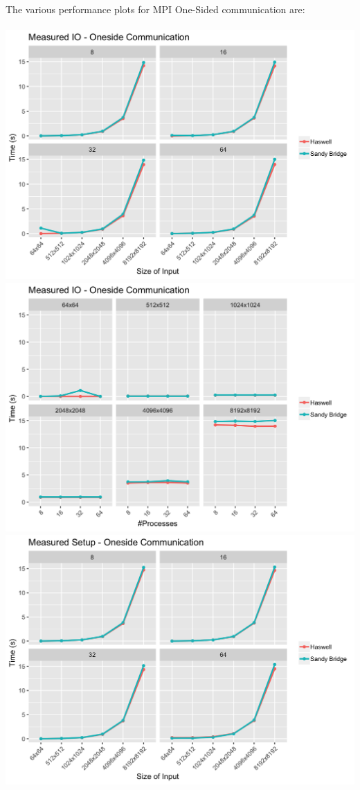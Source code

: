 \documentclass[10pt, letterpaper, twoside]{article}
\begin{document}
\begin{titlepage}
\begin{enumerate}
The various performance plots for MPI One-Sided communication are:\\
\\
\vspace{10mm}
\includegraphics[scale = 0.18]{OS_Measured-IO_Processes.png}
\includegraphics[scale = 0.18]{OS_Measured-IO_InputSize.png}
\vspace{10mm}
\includegraphics[scale = 0.18]{OS_Measured-Setup_Processes.png}

\end{enumerate}
\end{titlepage}
\end{document}
